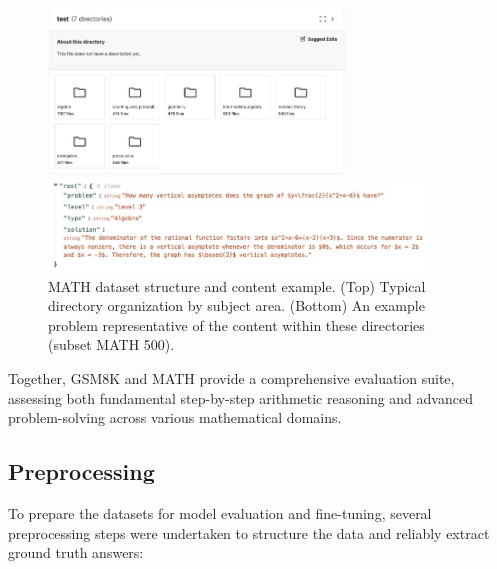 \documentclass[11pt]{article}
\begin{document}
\begin{itemize}
    \begin{figure}[h!]
        \centering

        \includegraphics[width=0.7\textwidth]{math1.png} %

        \vspace{1em} %

        \includegraphics[width=0.9\textwidth]{math2.png} %

        \caption{MATH dataset structure and content example. (Top) Typical directory organization by subject area. (Bottom) An example problem representative of the content within these directories (subset MATH 500).}
        \label{fig:math_structure_example} %
    \end{figure}


\end{itemize}


Together, GSM8K and MATH provide a comprehensive evaluation suite, assessing both fundamental step-by-step arithmetic reasoning and advanced problem-solving across various mathematical domains.

\subsection{Preprocessing}
To prepare the datasets for model evaluation and fine-tuning, several preprocessing steps were undertaken to structure the data and reliably extract ground truth answers:
\end{document}
